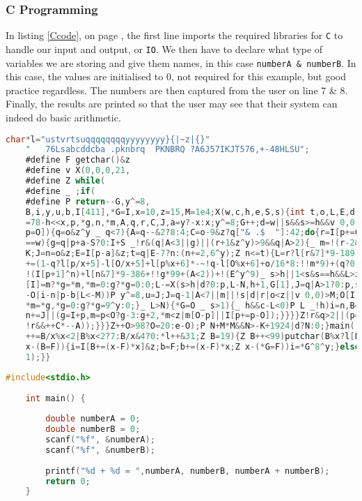 	\subsubsection{C Programming}
	In listing \ref{Ccode}, on page \pageref{Ccode}, the first line imports the required libraries for \texttt{C} to handle our input and output, or \texttt{IO}. We then have to declare what type of variables we are storing and give them names, in this case \texttt{numberA \& numberB}. In this case, the values are initialised to $0$, not required for this example, but good practice regardless. The numbers are then captured from the user on line 7 \& 8. Finally, the results are printed so that the user may see that their system can indeed do basic arithmetic.
	\begin{lstlisting}[language=C, caption=This listing is executable C code see http://www.nanochess.org, label=tinychess,float]
	char*l="ustvrtsuqqqqqqqqyyyyyyyy}{|~z|{}"
	"   76Lsabcddcba .pknbrq  PKNBRQ ?A6J57IKJT576,+-48HLSU";
	#define F getchar()&z
	#define v X(0,0,0,21,
	#define Z while(
	#define _ ;if(
	#define P return--G,y^=8,
	B,i,y,u,b,I[411],*G=I,x=10,z=15,M=1e4;X(w,c,h,e,S,s){int t,o,L,E,d,O=e,N=-M*M,K
	=78-h<<x,p,*g,n,*m,A,q,r,C,J,a=y?-x:x;y^=8;G++;d=w||s&&s>=h&&v 0,0)>M;do{_ o=I[
	p=O]){q=o&z^y _ q<7){A=q--&2?8:4;C=o-9&z?q["& .$  "]:42;do{r=I[p+=C[l]-64]_!w|p
	==w){g=q|p+a-S?0:I+S _!r&(q|A<3||g)||(r+1&z^y)>9&&q|A>2){_ m=!(r-2&7))P G[1]=O,
	K;J=n=o&z;E=I[p-a]&z;t=q|E-7?n:(n+=2,6^y);Z n<=t){L=r?l[r&7]*9-189-h-q:0 _ s)L
	+=(1-q?l[p/x+5]-l[O/x+5]+l[p%x+6]*-~!q-l[O%x+6]+o/16*8:!!m*9)+(q?0:!(I[p-1]^n)+
	!(I[p+1]^n)+l[n&7]*9-386+!!g*99+(A<2))+!(E^y^9)_ s>h||1<s&s==h&&L>z|d){p[I]=n,O
	[I]=m?*g=*m,*m=0:g?*g=0:0;L-=X(s>h|d?0:p,L-N,h+1,G[1],J=q|A>1?0:p,s)_!(h||s-1|B
	-O|i-n|p-b|L<-M))P y^=8,u=J;J=q-1|A<7||m||!s|d|r|o<z||v 0,0)>M;O[I]=o;p[I]=r;m?
	*m=*g,*g=0:g?*g=9^y:0;}_ L>N){*G=O _ s>1){_ h&&c-L<0)P L _!h)i=n,B=O,b=p;}N=L;}
	n+=J||(g=I+p,m=p<O?g-3:g+2,*m<z|m[O-p]||I[p+=p-O]);}}}}Z!r&q>2||(p=O,q|A>2|o>z&
	!r&&++C*--A));}}}Z++O>98?O=20:e-O);P N+M*M&&N>-K+1924|d?N:0;}main(){Z++B<121)*G
	++=B/x%x<2|B%x<2?7:B/x&4?0:*l++&31;Z B=19){Z B++<99)putchar(B%x?l[B[I]|16]:x)_
	x-(B=F)){i=I[B+=(x-F)*x]&z;b=F;b+=(x-F)*x;Z x-(*G=F))i=*G^8^y;}else v u,5);v u,
	1);}}
	\end{lstlisting}
	\begin{lstlisting}[language=C, caption=A simple C program to add two user typed numbers, label=Ccode, float]
	#include<stdio.h>
	
	int main() {
		
		double numberA = 0;
		double numberB = 0;
		scanf("%f", &numberA);
		scanf("%f", &numberB);
		
		printf("%d + %d = ",numberA, numberB, numberA + numberB);
		return 0;
	}
\end{lstlisting}

